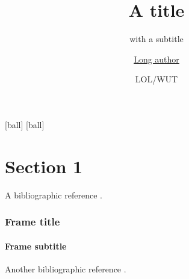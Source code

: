 {
   [ball]
   [ball]
}

\usepackage[english]{babel}
\usepackage[utf8x]{inputenc}
\usepackage[T1]{fontenc}

\title %
{A title}
\subtitle{with a subtitle}

\author[Short author] %
{\underline{Long author}}




\date[Now]{LOL/WUT}








\frame{\maketitle}

\section{Section 1}
\label{sec:section-1}

A bibliographic reference \cite{test04}.

\begin{frame}[label=testslide]
  \frametitle{Frame title}
  \framesubtitle{Frame subtitle}

  Another bibliographic reference \cite{test06}.
\end{frame}

